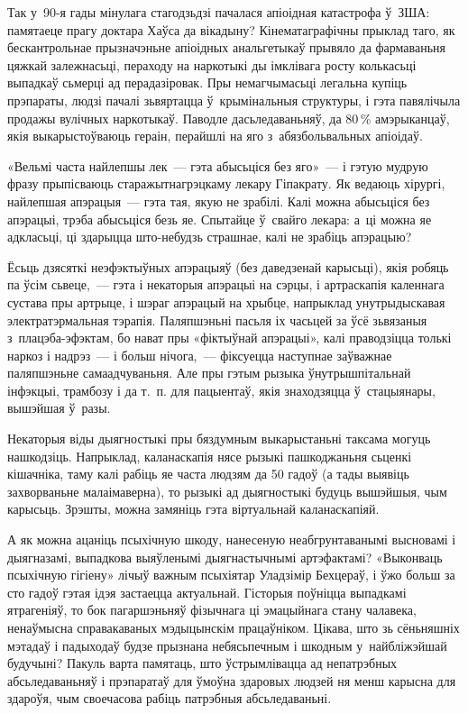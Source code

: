 Так у~90-я гады мінулага стагодзьдзі пачалася апіоідная катастрофа ў~ЗША: памятаеце прагу доктара Хаўса да вікадыну? Кінематаграфічны прыклад таго, як бескантрольнае прызначэньне апіоідных анальгетыкаў прывяло да фармаваньня цяжкай залежнасьці, пераходу на наркотыкі ды імклівага росту колькасьці выпадкаў сьмерці ад перадазіровак. Пры немагчымасьці легальна купіць прэпараты, людзі пачалі зьвяртацца ў~крымінальныя структуры, і гэта павялічыла продажы вулічных наркотыкаў. Паводле дасьледаваньняў, да 80\,\% амэрыканцаў, якія выкарыстоўваюць гераін, перайшлі на яго з~абязбольвальных апіоідаў.

«Вельмі часта найлепшы лек~--- гэта абысьціся без яго»~--- і гэтую мудрую фразу прыпісваюць старажытнагрэцкаму лекару Гіпакрату. Як ведаюць хірургі, найлепшая апэрацыя~--- гэта тая, якую не зрабілі. Калі можна абысьціся без апэрацыі, трэба абысьціся безь яе. Спытайце ў~свайго лекара: а~ці можна яе адкласьці, ці здарыцца што-небудзь страшнае, калі не зрабіць апэрацыю?

Ёсьць дзясяткі неэфэктыўных апэрацыяў (без даведзенай карысьці), якія робяць па ўсім сьвеце,~--- гэта і некаторыя апэрацыі на сэрцы, і артраскапія каленнага сустава пры артрыце, і шэраг апэрацый на хрыбце, напрыклад унутрыдыскавая электратэрмальная тэрапія. Паляпшэньні пасьля іх часьцей за ўсё зьвязаныя з~плацэба-эфэктам, бо нават пры «фіктыўнай апэрацыі», калі праводзіцца толькі наркоз і надрэз~--- і больш нічога,~--- фіксуецца наступнае заўважнае паляпшэньне самаадчуваньня. Але пры гэтым рызыка ўнутрышпітальнай інфэкцыі, трамбозу і да т.~п. для пацыентаў, якія знаходзяцца ў~стацыянары, вышэйшая ў~разы.

Некаторыя віды дыягностыкі пры бяздумным выкарыстаньні таксама могуць нашкодзіць. Напрыклад, каланаскапія нясе рызыкі пашкоджаньня сьценкі кішачніка, таму калі рабіць яе часта людзям да 50 гадоў (а тады выявіць захворваньне малаімаверна), то рызыкі ад дыягностыкі будуць вышэйшыя, чым карысьць. Зрэшты, можна замяніць гэта віртуальнай каланаскапіяй.

А як можна ацаніць псыхічную шкоду, нанесеную неабгрунтаванымі высновамі і дыягназамі, выпадкова выяўленымі дыягнастычнымі артэфактамі? «Выконваць псыхічную гігіену» лічыў важным псыхіятар Уладзімір Бехцераў, і ўжо больш за сто гадоў гэтая ідэя застаецца актуальнай. Гісторыя поўніцца выпадкамі ятрагеніяў, то бок пагаршэньняў фізычнага ці эмацыйнага стану чалавека, ненаўмысна справакаваных мэдыцынскім працаўніком. Цікава, што зь сёньняшніх мэтадаў і падыходаў будзе прызнана небясьпечным і шкодным у~найбліжэйшай будучыні? Пакуль варта памятаць, што ўстрымлівацца ад непатрэбных абсьледаваньняў і прэпаратаў для ўмоўна здаровых людзей ня менш карысна для здароўя, чым своечасова рабіць патрэбныя абсьледаваньні.

